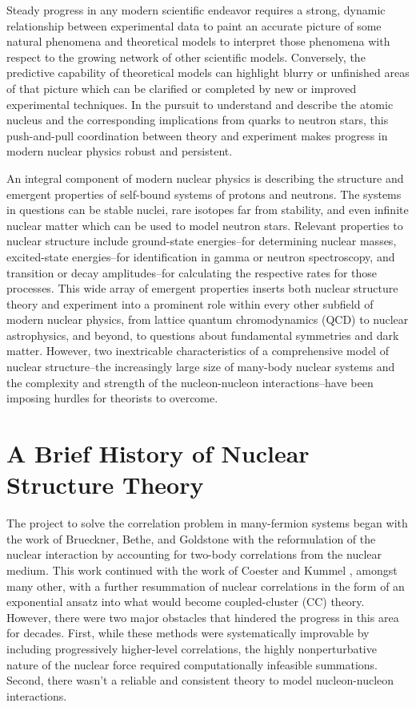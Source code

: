 \documentclass[../thesis.tex]{subfiles}
\begin{document}
Steady progress in any modern scientific endeavor requires a strong, dynamic relationship between experimental data to paint an accurate picture of some natural phenomena and theoretical models to interpret those phenomena with respect to the growing network of other scientific models. Conversely, the predictive capability of theoretical models can highlight blurry or unfinished areas of that picture which can be clarified or completed by new or improved experimental techniques. In the pursuit to understand and describe the atomic nucleus and the corresponding implications from quarks to neutron stars, this push-and-pull coordination between theory and experiment makes progress in modern nuclear physics robust and persistent.

An integral component of modern nuclear physics is describing the structure and emergent properties of self-bound systems of protons and neutrons. The systems in questions can be stable nuclei, rare isotopes far from stability, and even infinite nuclear matter which can be used to model neutron stars. Relevant properties to nuclear structure include ground-state energies--for determining nuclear masses, excited-state energies--for identification in gamma or neutron spectroscopy, and transition or decay amplitudes--for calculating the respective rates for those processes. This wide array of emergent properties inserts both nuclear structure theory and experiment into a prominent role within every other subfield of modern nuclear physics, from lattice quantum chromodynamics (QCD) to nuclear astrophysics, and beyond, to questions about fundamental symmetries and dark matter.  However, two inextricable characteristics of a comprehensive model of nuclear structure--the increasingly large size of many-body nuclear systems and the complexity and strength of the nucleon-nucleon interactions--have been imposing hurdles for theorists to overcome.


\section{A Brief History of Nuclear Structure Theory}

The project to solve the correlation problem in many-fermion systems began with the work of Brueckner, Bethe, and Goldstone \cite{BRUECKNER19551344,BETHE19561353,GOLDSTONE1957267} with the reformulation of the nuclear interaction by accounting for two-body correlations from the nuclear medium.  This work continued with the work of Coester \cite{COESTER1958421,COESTER1960477} and Kummel \cite{KUMMEL19781}, amongst many other, with a further resummation of nuclear correlations in the form of an exponential ansatz into what would become coupled-cluster (CC) theory.  However, there were two major obstacles that hindered the progress in this area for decades.  First, while these methods were systematically improvable by including progressively higher-level correlations, the highly nonperturbative nature of the nuclear force required computationally infeasible summations.  Second, there wasn't a reliable and consistent theory to model nucleon-nucleon interactions.
\end{document}
